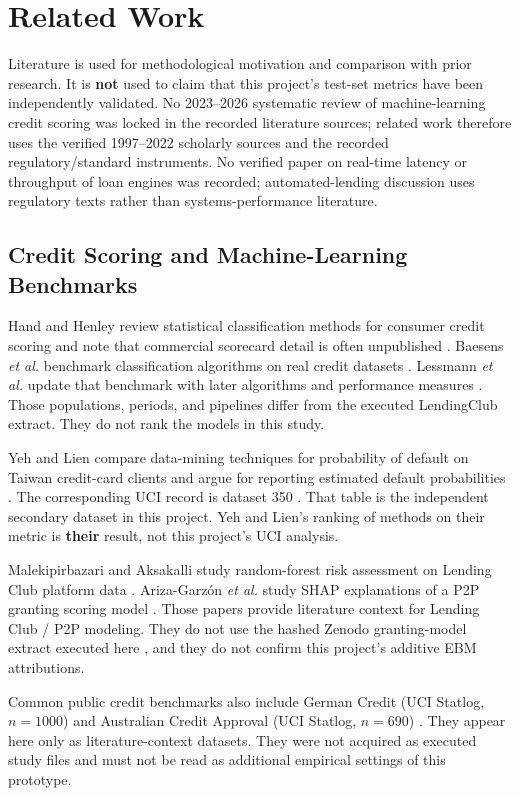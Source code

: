 \documentclass{ieeeaccess}
\begin{document}
\section{Related Work}

Literature is used for methodological motivation and comparison with prior research. It is \textbf{not} used to claim that this project's test-set metrics have been independently validated. No 2023--2026 systematic review of machine-learning credit scoring was locked in the recorded literature sources; related work therefore uses the verified 1997--2022 scholarly sources and the recorded regulatory/standard instruments. No verified paper on real-time latency or throughput of loan engines was recorded; automated-lending discussion uses regulatory texts rather than systems-performance literature.

\subsection{Credit Scoring and Machine-Learning Benchmarks}

Hand and Henley review statistical classification methods for consumer credit scoring and note that commercial scorecard detail is often unpublished \cite{b1}. Baesens \emph{et al.} benchmark classification algorithms on real credit datasets \cite{b2}. Lessmann \emph{et al.} update that benchmark with later algorithms and performance measures \cite{b3}. Those populations, periods, and pipelines differ from the executed LendingClub extract. They do not rank the models in this study.

Yeh and Lien compare data-mining techniques for probability of default on Taiwan credit-card clients and argue for reporting estimated default probabilities \cite{b4}. The corresponding UCI record is dataset 350 \cite{b21}. That table is the independent secondary dataset in this project. Yeh and Lien's ranking of methods on their metric is \textbf{their} result, not this project's UCI analysis.

Malekipirbazari and Aksakalli study random-forest risk assessment on Lending Club platform data \cite{b5}. Ariza-Garzón \emph{et al.} study SHAP explanations of a P2P granting scoring model \cite{b6}. Those papers provide literature context for Lending Club / P2P modeling. They do not use the hashed Zenodo granting-model extract executed here \cite{b20}, and they do not confirm this project's additive EBM attributions.

Common public credit benchmarks also include German Credit (UCI Statlog, \(n=1000\)) \cite{b22} and Australian Credit Approval (UCI Statlog, \(n=690\)) \cite{b23}. They appear here only as literature-context datasets. They were not acquired as executed study files and must not be read as additional empirical settings of this prototype.
\end{document}

